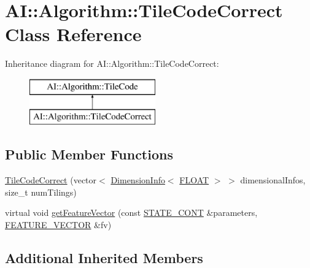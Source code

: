 \hypertarget{classAI_1_1Algorithm_1_1TileCodeCorrect}{\section{A\-I\-:\-:Algorithm\-:\-:Tile\-Code\-Correct Class Reference}
\label{classAI_1_1Algorithm_1_1TileCodeCorrect}
}
Inheritance diagram for A\-I\-:\-:Algorithm\-:\-:Tile\-Code\-Correct\-:\begin{figure}[H]
\begin{center}
\leavevmode
\includegraphics[height=2.000000cm]{classAI_1_1Algorithm_1_1TileCodeCorrect}
\end{center}
\end{figure}
\subsection*{Public Member Functions}
\begin{DoxyCompactItemize}
\item 
\hyperlink{classAI_1_1Algorithm_1_1TileCodeCorrect_a4347bf107c7d252ce0e080be0e134313}{Tile\-Code\-Correct} (vector$<$ \hyperlink{classAI_1_1Algorithm_1_1DimensionInfo}{Dimension\-Info}$<$ \hyperlink{namespaceAI_a41b74884a20833db653dded3918e05c3}{F\-L\-O\-A\-T} $>$ $>$ dimensional\-Infos, size\-\_\-t num\-Tilings)
\item 
virtual void \hyperlink{classAI_1_1Algorithm_1_1TileCodeCorrect_abb6d45df5a7f6d6263f063586b417eaa}{get\-Feature\-Vector} (const \hyperlink{namespaceAI_aff63ec21d97dd5f086fddbc3103f5707}{S\-T\-A\-T\-E\-\_\-\-C\-O\-N\-T} \&parameters, \hyperlink{namespaceAI_a23a39e1b301a5c1345fa508796940631}{F\-E\-A\-T\-U\-R\-E\-\_\-\-V\-E\-C\-T\-O\-R} \&fv)
\end{DoxyCompactItemize}
\subsection*{Additional Inherited Members}


